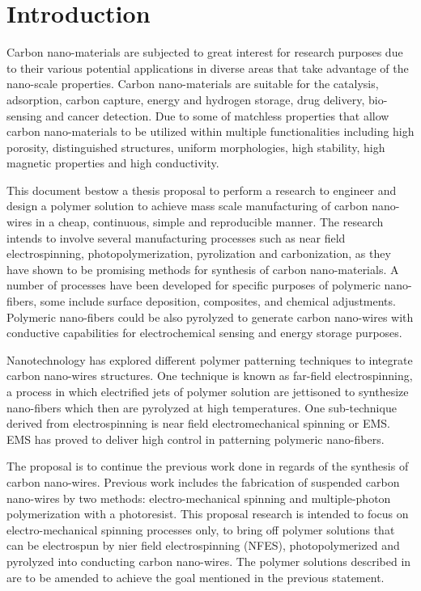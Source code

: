 
\chapter{Introduction} %

\label{Chapter:Introduction}

Carbon nano-materials are subjected to great interest for research purposes due to their various potential applications in diverse areas that take advantage of the nano-scale properties. Carbon nano-materials are suitable for the catalysis, adsorption, carbon capture, energy and hydrogen storage, drug delivery, bio-sensing and cancer detection. \cite{Siddiqui2019} Due to some of matchless properties that allow carbon nano-materials to be utilized within multiple functionalities including high porosity, distinguished structures, uniform morphologies, high stability, high magnetic properties and high conductivity. \cite{Siddiqui2019}

This document bestow a thesis proposal to perform a research to engineer and design a polymer solution to achieve mass scale manufacturing of carbon nano-wires in a cheap, continuous, simple and reproducible manner. The research intends to involve several manufacturing processes such as near field electrospinning, photopolymerization, pyrolization and carbonization, as they have shown to be promising methods for synthesis of carbon nano-materials. \cite{Cardenas2017} A number of processes have been developed for specific purposes of polymeric nano-fibers, some include surface deposition, composites, and chemical adjustments. Polymeric nano-fibers could be also pyrolyzed to generate carbon nano-wires with conductive capabilities \cite{Madou2011} for electrochemical sensing and energy storage purposes.

Nanotechnology has explored different polymer patterning techniques to integrate carbon nano-wires structures. One technique is known as far-field electrospinning, a process in which electrified jets of polymer solution are jettisoned to synthesize nano-fibers which then are pyrolyzed at high temperatures. One sub-technique derived from electrospinning is near field electromechanical spinning or EMS. EMS has proved to deliver high control in patterning polymeric nano-fibers. \cite{Cardenas2017}

The proposal is to continue the previous work done in regards of the synthesis of carbon nano-wires. Previous work includes the fabrication of suspended carbon nano-wires by two methods: electro-mechanical spinning and multiple-photon polymerization with a photoresist. \cite{Cardenas2017} This proposal research is intended to focus on electro-mechanical spinning processes only, to bring off polymer solutions that can be electrospun by nier field electrospinning (NFES), photopolymerized and pyrolyzed into conducting carbon nano-wires. The polymer solutions described in \cite{Cardenas2017} are to be amended to achieve the goal mentioned in the previous statement.

